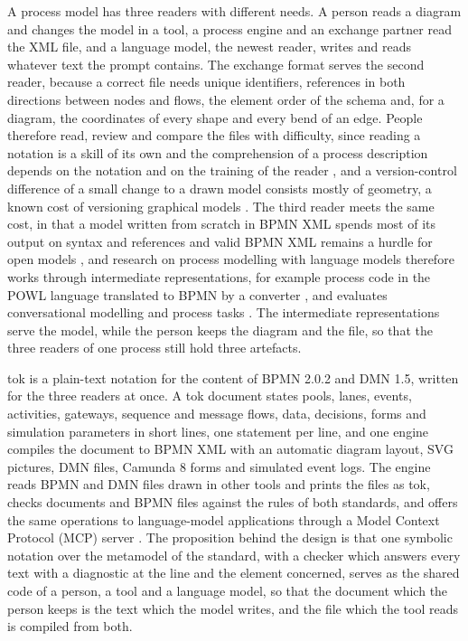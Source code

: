 \documentclass[11pt,a4paper]{article}
\begin{document}
A process model has three readers with different needs. A person reads a diagram and changes the model in a tool, a process engine and an exchange partner read the XML file, and a language model, the newest reader, writes and reads whatever text the prompt contains. The exchange format serves the second reader, because a correct file needs unique identifiers, references in both directions between nodes and flows, the element order of the schema and, for a diagram, the coordinates of every shape and every bend of an edge. People therefore read, review and compare the files with difficulty, since reading a notation is a skill of its own \citep{Petre1995looking} and the comprehension of a process description depends on the notation and on the training of the reader \citep{Ottensooser2012making,Figl2017comprehension}, and a version-control difference of a small change to a drawn model consists mostly of geometry, a known cost of versioning graphical models \citep{Altmanninger2009survey}. The third reader meets the same cost, in that a model written from scratch in BPMN XML spends most of its output on syntax and references and valid BPMN XML remains a hurdle for open models \citep{Lauer2026competences}, and research on process modelling with language models therefore works through intermediate representations, for example process code in the POWL language translated to BPMN by a converter \citep{Kourani2024}, and evaluates conversational modelling and process tasks \citep{Klievtsova2023,Grohs2024}. The intermediate representations serve the model, while the person keeps the diagram and the file, so that the three readers of one process still hold three artefacts.

tok is a plain-text notation for the content of BPMN 2.0.2 and DMN 1.5, written for the three readers at once. A tok document states pools, lanes, events, activities, gateways, sequence and message flows, data, decisions, forms and simulation parameters in short lines, one statement per line, and one engine compiles the document to BPMN XML with an automatic diagram layout, SVG pictures, DMN files, Camunda 8 forms and simulated event logs. The engine reads BPMN and DMN files drawn in other tools and prints the files as tok, checks documents and BPMN files against the rules of both standards, and offers the same operations to language-model applications through a Model Context Protocol (MCP) server \citep{MCP2025}. The proposition behind the design is that one symbolic notation over the metamodel of the standard, with a checker which answers every text with a diagnostic at the line and the element concerned, serves as the shared code of a person, a tool and a language model, so that the document which the person keeps is the text which the model writes, and the file which the tool reads is compiled from both.
\end{document}
